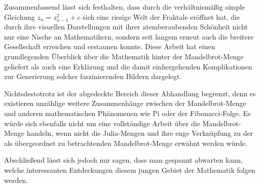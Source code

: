 
Zusammenfassend lässt sich festhalten, dass durch die verhältnismäßig simple
Gleichung $z_n = z_{n-1}^2 + c$ sich eine riesige Welt der Fraktale eröffnet
hat, die durch ihre visuellen Darstellungen mit ihrer atemberaubenden Schönheit
nicht nur eine Nische an Mathematikern, sondern seit langem erneut auch die
breitere Gesellschaft erreichen und erstaunen konnte.
Diese Arbeit hat einen grundlegenden Überblick über die Mathematik hinter der
Mandelbrot-Menge geliefert als auch eine Erklärung und die damit einhergehenden
Komplikationen zur Generierung solcher faszinierenden Bildern dargelegt.

Nichtsdestotrotz ist der abgedeckte Bereich dieser Abhandlung begrenzt, denn es
existieren unzählige weitere Zusammenhänge zwischen der Mandelbrot-Menge und
anderen mathematischen Phänomenen wie Pi oder der Fibonacci-Folge.
Es würde sich ebenfalls nicht um eine vollständige Arbeit über die
Mandelbrot-Menge handeln, wenn nicht die Julia-Mengen und ihre enge Verknüpfung
zu der als übergeordnet zu betrachtenden Mandelbrot-Menge erwähnt werden würde.

Abschließend lässt sich jedoch nur sagen, dass man gespannt abwarten kann,
welche interessanten Entdeckungen diesem jungen Gebiet der Mathematik folgen werden.